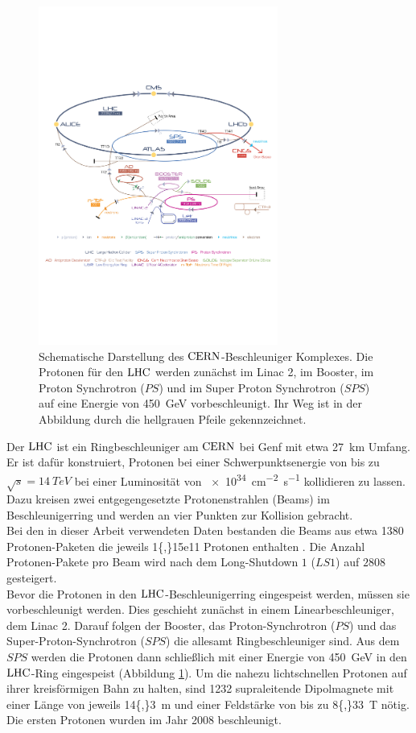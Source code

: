\begin{figure}[htpb]
	\centering
		\includegraphics[width=0.7\textwidth]{fig/cern_scheme.pdf}
	\caption{Schematische Darstellung des $\mbox{CERN}$-Beschleuniger Komplexes. Die Protonen für den $\mbox{LHC}$ werden zunächst im Linac 2, im Booster, im Proton Synchrotron ($P\!S$) und im Super Proton Synchrotron ($S\!P\!S$) auf eine Energie von \SI{450}{GeV} vorbeschleunigt. Ihr Weg ist in der Abbildung durch die hellgrauen Pfeile gekennzeichnet. \cite{cern_scheme}}
	\label{fig:cern_scheme} 
\end{figure} 
Der $\mbox{LHC}$ ist ein Ringbeschleuniger am $\mbox{CERN}$ bei Genf mit etwa \SI{27}{km} Umfang. Er ist dafür konstruiert, Protonen bei einer Schwerpunktsenergie von bis zu $\sqrt{s}=\SI{14}{TeV}$ bei einer Luminosität von \SI{e34}{cm^{-2}s^{-1}} \cite{lhc_design} kollidieren zu lassen. Dazu kreisen zwei entgegengesetzte Protonenstrahlen (Beams) im Beschleunigerring und werden an vier Punkten zur Kollision gebracht. \\
Bei den in dieser Arbeit verwendeten Daten bestanden die Beams aus etwa \num{1380} Protonen-Paketen die jeweils \num{1{,}15e11} Protonen enthalten \cite{LHC_statistik}. Die Anzahl Protonen-Pakete pro Beam wird nach dem Long-Shutdown $1$ ($L\!S1$) auf $2808$ \cite{lhc_design} gesteigert. \\
Bevor die Protonen in den $\mbox{LHC}$-Beschleunigerring eingespeist werden, müssen sie vorbeschleunigt werden. Dies geschieht zunächst in einem Linearbeschleuniger, dem Linac 2. Darauf folgen der Booster, das Proton-Synchrotron ($P\!S$) und das Super-Proton-Synchrotron ($S\!P\!S$) die allesamt Ringbeschleuniger sind. Aus dem $S\!P\!S$ werden die Protonen dann schließlich mit einer Energie von \SI{450}{GeV} \cite{lhc_design} in den $\mbox{LHC}$-Ring eingespeist (Abbildung \ref{fig:cern_scheme}). Um die nahezu lichtschnellen Protonen auf ihrer kreisförmigen Bahn zu halten, sind  \num{1232}  supraleitende Dipolmagnete mit einer Länge von jeweils \SI{14{,}3}{m} und einer Feldstärke von bis zu \SI{8{,}33}{T} nötig. Die ersten Protonen wurden im Jahr \num{2008} beschleunigt.\\

